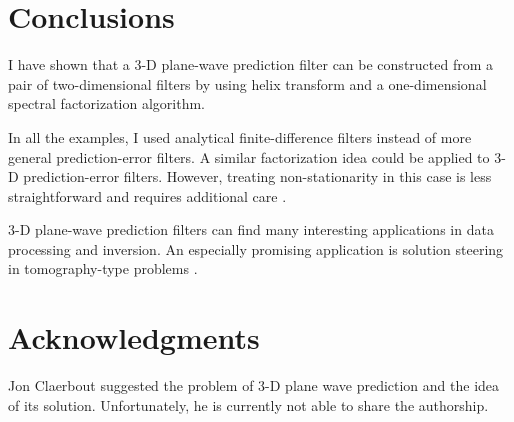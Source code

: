 \section{Conclusions}
I have shown that a 3-D plane-wave prediction filter can be
constructed from a pair of two-dimensional filters by using helix
transform and a one-dimensional spectral factorization algorithm.
\par
In all the examples, I used analytical finite-difference filters
instead of more general prediction-error filters.  A similar
factorization idea could be applied to 3-D prediction-error filters.
However, treating non-stationarity in this case is less
straightforward and requires additional care
\cite{Crawley.sep.97.sean2,Clapp.sep.100.bob3}.
\par
3-D plane-wave prediction filters can find many interesting
applications in data processing and inversion.  An especially
promising application is solution steering in tomography-type
problems \cite{Clapp.sep.95.bob1,Clapp.sep.97.bob2}.


\section{Acknowledgments}
Jon Claerbout suggested the problem of 3-D plane wave prediction and
the idea of its solution.  Unfortunately, he is currently not able to
share the authorship.




